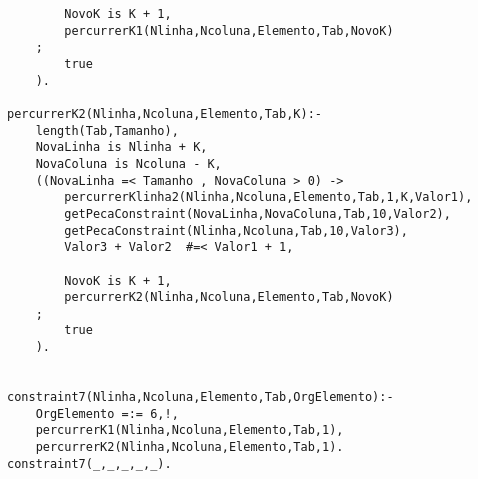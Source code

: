 \documentclass[runningheads]{llncs}
\begin{document}
\begin{lstlisting}
        NovoK is K + 1,
        percurrerK1(Nlinha,Ncoluna,Elemento,Tab,NovoK)
    ;
        true
    ).

percurrerK2(Nlinha,Ncoluna,Elemento,Tab,K):-
    length(Tab,Tamanho),
    NovaLinha is Nlinha + K,
    NovaColuna is Ncoluna - K,
    ((NovaLinha =< Tamanho , NovaColuna > 0) ->
        percurrerKlinha2(Nlinha,Ncoluna,Elemento,Tab,1,K,Valor1),
        getPecaConstraint(NovaLinha,NovaColuna,Tab,10,Valor2),
        getPecaConstraint(Nlinha,Ncoluna,Tab,10,Valor3),
        Valor3 + Valor2  #=< Valor1 + 1,

        NovoK is K + 1,
        percurrerK2(Nlinha,Ncoluna,Elemento,Tab,NovoK)
    ;
        true
    ).


constraint7(Nlinha,Ncoluna,Elemento,Tab,OrgElemento):-
    OrgElemento =:= 6,!,
    percurrerK1(Nlinha,Ncoluna,Elemento,Tab,1),
    percurrerK2(Nlinha,Ncoluna,Elemento,Tab,1).
constraint7(_,_,_,_,_).
\end{lstlisting}
\end{document}
